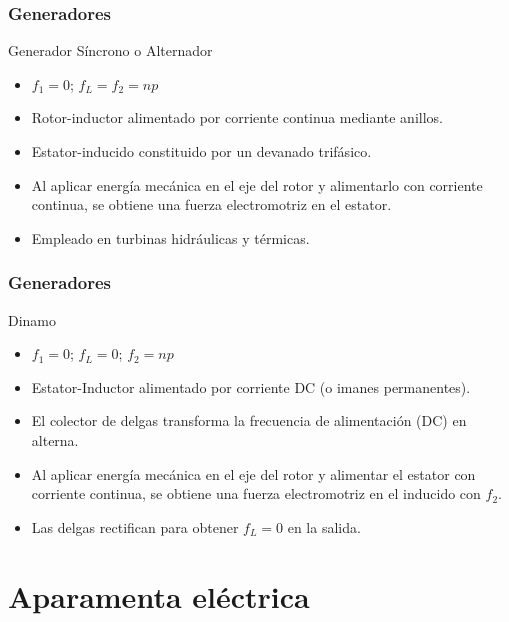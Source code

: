 \documentclass[serif, xcolor=dvipsnames]{beamer}
\begin{document}
\begin{frame}
  \frametitle{Generadores}
  \begin{block} {Generador Síncrono o Alternador}
    \begin{itemize}
    \item $f_{1}=0$; \textrm{$f_{L}=f_{2}=np$}
    \item Rotor-inductor alimentado por corriente continua mediante
      anillos.
    \item Estator-inducido constituido por un devanado trifásico.
    \item Al aplicar energía mecánica en el eje del rotor y
      alimentarlo con corriente continua, se obtiene una fuerza
      electromotriz en el estator.
    \item Empleado en turbinas hidráulicas y térmicas.
    \end{itemize}
  \end{block}

\end{frame}
\begin{frame}
  \frametitle{Generadores}
  \begin{block} {Dinamo}
    \begin{itemize}
    \item $f_{1}=0$; $f_{L}=0$;\textrm{ $f_{2}=np$}
    \item Estator-Inductor alimentado por corriente DC (o imanes
      permanentes).
    \item El colector de delgas transforma la frecuencia de
      alimentación (DC) en alterna.
    \item Al aplicar energía mecánica en el eje del rotor y alimentar
      el estator con corriente continua, se obtiene una fuerza
      electromotriz en el inducido con $f_{2}$.
    \item Las delgas rectifican para obtener $f_{L}=0$ en la salida.
    \end{itemize}
  \end{block}

\end{frame}
\section{Aparamenta eléctrica}
\end{document}
